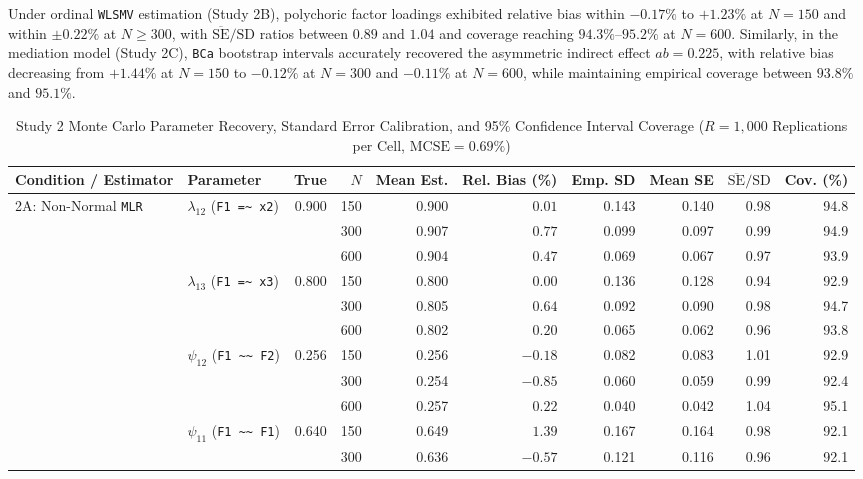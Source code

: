 ﻿\documentclass[12pt,letterpaper]{article}
\begin{document}
Under ordinal \texttt{WLSMV} estimation (Study 2B), polychoric factor loadings exhibited relative bias within $-0.17\%$ to $+1.23\%$ at $N = 150$ and within $\pm 0.22\%$ at $N \ge 300$, with $\overline{\mathrm{SE}}/\mathrm{SD}$ ratios between $0.89$ and $1.04$ and coverage reaching $94.3\%$--$95.2\%$ at $N = 600$. Similarly, in the mediation model (Study 2C), \texttt{BCa} bootstrap intervals accurately recovered the asymmetric indirect effect $ab = 0.225$, with relative bias decreasing from $+1.44\%$ at $N = 150$ to $-0.12\%$ at $N = 300$ and $-0.11\%$ at $N = 600$, while maintaining empirical coverage between $93.8\%$ and $95.1\%$.

\begin{table}[htbp]
\centering
\caption{Study 2 Monte Carlo Parameter Recovery, Standard Error Calibration, and 95\% Confidence Interval Coverage ($R = 1{,}000$ Replications per Cell, $\mathrm{MCSE} = 0.69\%$)}
\label{tab:study2}
\footnotesize
\setlength{\tabcolsep}{4pt}
\begin{tabular}{llrrrrrrrr}
\toprule
Condition / Estimator & Parameter & True & $N$ & Mean Est. & Rel. Bias (\%) & Emp. SD & Mean SE & $\overline{\mathrm{SE}}/\mathrm{SD}$ & Cov. (\%) \\
\midrule
2A: Non-Normal \texttt{MLR} & $\lambda_{12}$ (\texttt{F1 =\textasciitilde{} x2}) & 0.900 & 150 & 0.900 & $0.01$ & 0.143 & 0.140 & 0.98 & 94.8 \\
 & & & 300 & 0.907 & $0.77$ & 0.099 & 0.097 & 0.99 & 94.9 \\
 & & & 600 & 0.904 & $0.47$ & 0.069 & 0.067 & 0.97 & 93.9 \\
 & $\lambda_{13}$ (\texttt{F1 =\textasciitilde{} x3}) & 0.800 & 150 & 0.800 & $0.00$ & 0.136 & 0.128 & 0.94 & 92.9 \\
 & & & 300 & 0.805 & $0.64$ & 0.092 & 0.090 & 0.98 & 94.7 \\
 & & & 600 & 0.802 & $0.20$ & 0.065 & 0.062 & 0.96 & 93.8 \\
 & $\psi_{12}$ (\texttt{F1 \textasciitilde\textasciitilde{} F2}) & 0.256 & 150 & 0.256 & $-0.18$ & 0.082 & 0.083 & 1.01 & 92.9 \\
 & & & 300 & 0.254 & $-0.85$ & 0.060 & 0.059 & 0.99 & 92.4 \\
 & & & 600 & 0.257 & $0.22$ & 0.040 & 0.042 & 1.04 & 95.1 \\
 & $\psi_{11}$ (\texttt{F1 \textasciitilde\textasciitilde{} F1}) & 0.640 & 150 & 0.649 & $1.39$ & 0.167 & 0.164 & 0.98 & 92.1 \\
 & & & 300 & 0.636 & $-0.57$ & 0.121 & 0.116 & 0.96 & 92.1 \\

\end{tabular}
\end{table}
\end{document}
